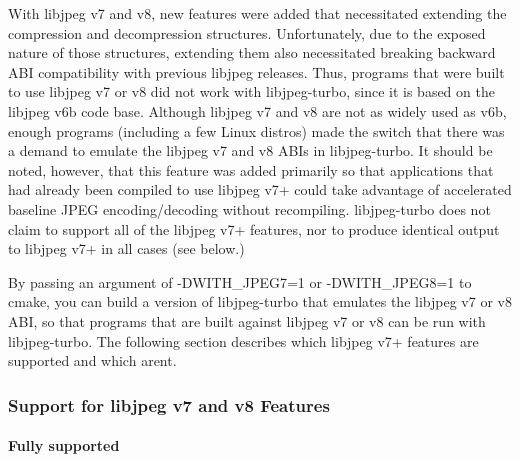 With libjpeg v7 and v8, new features were added that necessitated extending the compression and decompression structures. Unfortunately, due to the exposed nature of those structures, extending them also necessitated breaking backward A\+BI compatibility with previous libjpeg releases. Thus, programs that were built to use libjpeg v7 or v8 did not work with libjpeg-\/turbo, since it is based on the libjpeg v6b code base. Although libjpeg v7 and v8 are not as widely used as v6b, enough programs (including a few Linux distros) made the switch that there was a demand to emulate the libjpeg v7 and v8 A\+B\+Is in libjpeg-\/turbo. It should be noted, however, that this feature was added primarily so that applications that had already been compiled to use libjpeg v7+ could take advantage of accelerated baseline J\+P\+EG encoding/decoding without recompiling. libjpeg-\/turbo does not claim to support all of the libjpeg v7+ features, nor to produce identical output to libjpeg v7+ in all cases (see below.)

By passing an argument of {\ttfamily -\/\+D\+W\+I\+T\+H\+\_\+\+J\+P\+E\+G7=1} or {\ttfamily -\/\+D\+W\+I\+T\+H\+\_\+\+J\+P\+E\+G8=1} to {\ttfamily cmake}, you can build a version of libjpeg-\/turbo that emulates the libjpeg v7 or v8 A\+BI, so that programs that are built against libjpeg v7 or v8 can be run with libjpeg-\/turbo. The following section describes which libjpeg v7+ features are supported and which aren\textquotesingle{}t.

\subsubsection*{Support for libjpeg v7 and v8 Features}

\paragraph*{Fully supported}


